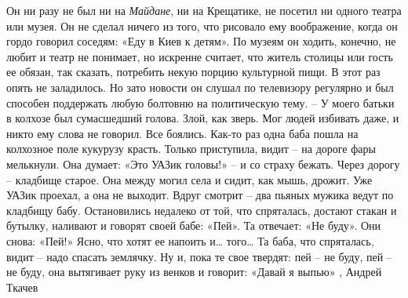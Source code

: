 Он ни разу не был ни на \emph{Майдане}, ни на Крещатике, не посетил ни одного
театра или музея. Он не сделал ничего из того, что рисовало ему воображение,
когда он гордо говорил соседям: «Еду в Киев к детям». По музеям он ходить,
конечно, не любит и театр не понимает, но искренне считает, что житель столицы
или гость ее обязан, так сказать, потребить некую порцию культурной пищи. В
этот раз опять не заладилось. Но зато новости он слушал по телевизору регулярно
и был способен поддержать любую болтовню на политическую тему.  – У моего
батьки в колхозе был сумасшедший голова. Злой, как зверь. Мог людей избивать
даже, и никто ему слова не говорил. Все боялись. Как-то раз одна баба пошла на
колхозное поле кукурузу красть. Только приступила, видит – на дороге фары
мелькнули. Она думает: «Это УАЗик головы!» – и со страху бежать. Через дорогу –
кладбище старое. Она между могил села и сидит, как мышь, дрожит. Уже УАЗик
проехал, а она не выходит. Вдруг смотрит – два пьяных мужика ведут по кладбищу
бабу. Остановились недалеко от той, что спряталась, достают стакан и бутылку,
наливают и говорят своей бабе: «Пей». Та отвечает: «Не буду». Они снова: «Пей!»
Ясно, что хотят ее напоить и… того… Та баба, что спряталась, видит – надо
спасать землячку. Ну и, пока те свое твердят: пей – не буду, пей – не буду, она
вытягивает руку из венков и говорит: «Давай я выпью»
, Андрей Ткачев
